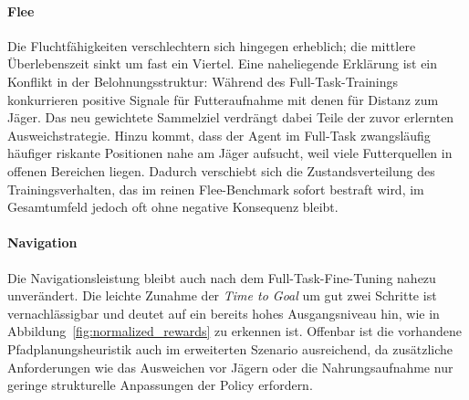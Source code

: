 \paragraph{Flee}  
Die Fluchtfähigkeiten verschlechtern sich hingegen erheblich; die mittlere Überlebenszeit sinkt um fast ein Viertel. Eine naheliegende Erklärung ist ein Konflikt in der Belohnungsstruktur: Während des Full-Task-Trainings konkurrieren positive Signale für Futteraufnahme mit denen für Distanz zum Jäger. Das neu gewichtete Sammelziel verdrängt dabei Teile der zuvor erlernten Ausweichstrategie. Hinzu kommt, dass der Agent im Full-Task zwangsläufig häufiger riskante Positionen nahe am Jäger aufsucht, weil viele Futterquellen in offenen Bereichen liegen. Dadurch verschiebt sich die Zustandsverteilung des Trainingsverhalten, das im reinen Flee-Benchmark sofort bestraft wird, im Gesamtumfeld jedoch oft ohne negative Konsequenz bleibt. 

\paragraph{Navigation}  
Die Navigationsleistung bleibt auch nach dem Full-Task-Fine-Tuning nahezu unverändert. Die leichte Zunahme der \emph{Time to Goal} um gut zwei Schritte ist vernachlässigbar und deutet auf ein bereits hohes Ausgangsniveau hin, wie in Abbildung~\ref{fig:normalized_rewards} zu erkennen ist. Offenbar ist die vorhandene Pfadplanungsheuristik auch im erweiterten Szenario ausreichend, da zusätzliche Anforderungen wie das Ausweichen vor Jägern oder die Nahrungsaufnahme nur geringe strukturelle Anpassungen der Policy erfordern.